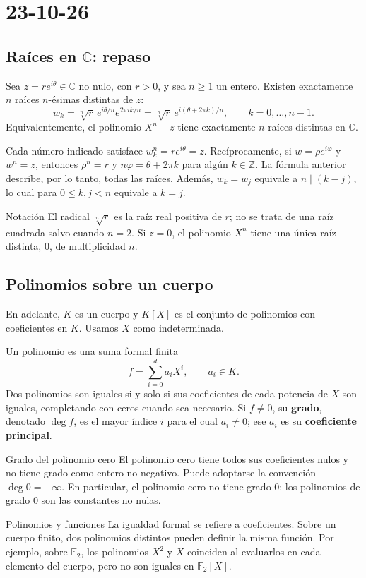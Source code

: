 \chapter{23-10-26}
\section{Raíces en $\mathbb C$: repaso}
\begin{proposicion}
Sea $z=re^{i\theta}\in\mathbb C$ no nulo, con $r>0$, y sea $n\geq1$
un entero. Existen exactamente $n$ raíces $n$-ésimas distintas de $z$:
\[
w_k=\sqrt[n]{r}\,e^{i\theta/n}e^{2\pi ik/n}
=\sqrt[n]{r}\,e^{i(\theta+2\pi k)/n},\qquad k=0,\dots,n-1.
\]
Equivalentemente, el polinomio $X^n-z$ tiene exactamente $n$ raíces
distintas en $\mathbb C$.
\end{proposicion}
\begin{demostracion}
Cada número indicado satisface $w_k^n=re^{i\theta}=z$.
Recíprocamente, si $w=\rho e^{i\varphi}$ y $w^n=z$, entonces
$\rho^n=r$ y $n\varphi=\theta+2\pi k$ para algún $k\in\mathbb Z$.
La fórmula anterior describe, por lo tanto, todas las raíces.
Además, $w_k=w_j$ equivale a $n\mid(k-j)$, lo cual para
$0\leq k,j<n$ equivale a $k=j$.
\end{demostracion}
\begin{nota}{Notación}
El radical $\sqrt[n]{r}$ es la raíz real positiva de $r$; no se trata
de una raíz cuadrada salvo cuando $n=2$. Si $z=0$, el polinomio
$X^n$ tiene una única raíz distinta, $0$, de multiplicidad $n$.
\end{nota}

\section{Polinomios sobre un cuerpo}
En adelante, $K$ es un cuerpo y $K[X]$ es el conjunto de polinomios
con coeficientes en $K$. Usamos $X$ como indeterminada.

\begin{definicion}
Un polinomio es una suma formal finita
\[
f=\sum_{i=0}^{d}a_iX^i,\qquad a_i\in K.
\]
Dos polinomios son iguales si y solo si sus coeficientes de cada
potencia de $X$ son iguales, completando con ceros cuando sea necesario.
Si $f\neq0$, su \textbf{grado}, denotado $\deg f$, es el mayor índice
$i$ para el cual $a_i\neq0$; ese $a_i$ es su \textbf{coeficiente principal}.
\end{definicion}
\begin{nota}{Grado del polinomio cero}
El polinomio cero tiene todos sus coeficientes nulos y no tiene grado
como entero no negativo. Puede adoptarse la convención
$\deg0=-\infty$. En particular, el polinomio cero no tiene grado $0$:
los polinomios de grado $0$ son las constantes no nulas.
\end{nota}
\begin{nota}{Polinomios y funciones}
La igualdad formal se refiere a coeficientes. Sobre un cuerpo finito,
dos polinomios distintos pueden definir la misma función. Por ejemplo,
sobre $\mathbb F_2$, los polinomios $X^2$ y $X$ coinciden al evaluarlos
en cada elemento del cuerpo, pero no son iguales en $\mathbb F_2[X]$.
\end{nota}

